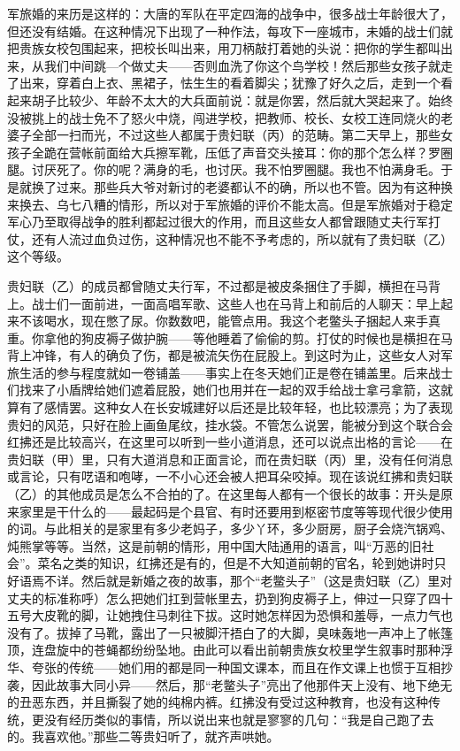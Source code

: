 军旅婚的来历是这样的：大唐的军队在平定四海的战争中，很多战士年龄很大了，但还没有结婚。在这种情况下出现了一种作法，每攻下一座城市，未婚的战士们就把贵族女校包围起来，把校长叫出来，用刀柄敲打着她的头说：把你的学生都叫出来，从我们中间跳—个做丈夫——否则血洗了你这个鸟学校！然后那些女孩子就走了出来，穿着白上衣、黑裙子，怯生生的看着脚尖；犹豫了好久之后，走到一个看起来胡子比较少、年龄不太大的大兵面前说：就是你罢，然后就大哭起来了。始终没被挑上的战士免不了怒火中烧，闯进学校，把教师、校长、女校工连同烧火的老婆子全部一扫而光，不过这些人都属于贵妇联（丙）的范畴。第二天早上，那些女孩子全跪在营帐前面给大兵擦军靴，压低了声音交头接耳：你的那个怎么样？罗圈腿。讨厌死了。你的呢？满身的毛，也讨厌。我不怕罗圈腿。我也不怕满身毛。于是就换了过来。那些兵大爷对新讨的老婆都认不的确，所以也不管。因为有这种换来换去、乌七八糟的情形，所以对于军旅婚的评价不能太高。但是军旅婚对于稳定军心乃至取得战争的胜利都起过很大的作用，而且这些女人都曾跟随丈夫行军打仗，还有人流过血负过伤，这种情况也不能不予考虑的，所以就有了贵妇联（乙）这个等级。 

贵妇联（乙）的成员都曾随丈夫行军，不过都是被皮条捆住了手脚，横担在马背上。战士们一面前进，一面高唱军歌、这些人也在马背上和前后的人聊天：早上起来不该喝水，现在憋了尿。你数数吧，能管点用。我这个老鳖头子捆起人来手真重。你拿他的狗皮褥子做护腕——等他睡着了偷偷的剪。打仗的时候也是横担在马背上冲锋，有人的确负了伤，都是被流矢伤在屁股上。到这时为止，这些女人对军旅生活的参与程度就如一卷铺盖——事实上在冬天她们正是卷在铺盖里。后来战士们找来了小盾牌给她们遮着屁股，她们也用并在一起的双手给战士拿弓拿箭，这就算有了感情罢。这种女人在长安城建好以后还是比较年轻，也比较漂亮；为了表现贵妇的风范，只好在脸上画鱼尾纹，挂水袋。不管怎么说罢，能被分到这个联合会红拂还是比较高兴，在这里可以听到一些小道消息，还可以说点出格的言论——在贵妇联（甲）里，只有大道消息和正面言论，而在贵妇联（丙）里，没有任何消息或言论，只有呓语和咆哮，一不小心还会被人把耳朵咬掉。现在该说红拂和贵妇联（乙）的其他成员是怎么不合拍的了。在这里每人都有一个很长的故事：开头是原来家里是干什么的——最起码是个县官、有时还要用到枢密节度等等现代很少使用的词。与此相关的是家里有多少老妈子，多少丫环，多少厨房，厨子会烧汽锅鸡、炖熊掌等等。当然，这是前朝的情形，用中国大陆通用的语言，叫“万恶的旧社会”。菜名之类的知识，红拂还是有的，但是不大知道前朝的官名，轮到她讲时只好语焉不详。然后就是新婚之夜的故事，那个“老鳖头子”（这是贵妇联（乙）里对丈夫的标准称呼）怎么把她们扛到营帐里去，扔到狗皮褥子上，伸过一只穿了四十五号大皮靴的脚，让她拽住马刺往下拔。这时她怎样因为恐惧和羞辱，一点力气也没有了。拔掉了马靴，露出了一只被脚汗捂白了的大脚，臭味轰地一声冲上了帐篷顶，连盘旋中的苍蝇都纷纷坠地。由此可以看出前朝贵族女校里学生叙事时那种浮华、夸张的传统——她们用的都是同一种国文课本，而且在作文课上也惯于互相抄袭，因此故事大同小异——然后，那“老鳖头子”亮出了他那件天上没有、地下绝无的丑恶东西，并且撕裂了她的纯棉内裤。红拂没有受过这种教育，也没有这种传统，更没有经历类似的事情，所以说出来也就是寥寥的几句：“我是自己跑了去的。我喜欢他。”那些二等贵妇听了，就齐声哄她。 

